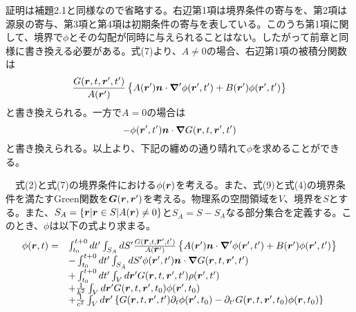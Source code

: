 \documentclass[dvipdfmx, 9pt, a4paper]{jsarticle}
\newcommand{\bm}[1]{{\mbox{\boldmath $#1$}}}
\newcommand{\bnabla}{\bm \nabla}
\begin{document}
証明は補題2.1と同様なので省略する。右辺第1項は境界条件の寄与を、第2項は源泉の寄与、第3項と第4項は初期条件の寄与を表している。このうち第1項に関して、境界で$\phi$とその勾配が同時に与えられることはない。したがって前章と同様に書き換える必要がある。式(7)より、$A \neq 0$の場合、右辺第1項の被積分関数は
\begin{equation}
\frac{G(\bm r, t, \bm r', t')}{A(\bm r')}\left\{ A(\bm r')\bm n \cdot \bnabla'\phi(\bm r', t')+B(\bm r')\phi(\bm r', t') \right\} \notag
\end{equation}
と書き換えられる。一方で$A=0$の場合は
\begin{equation}
-\phi(\bm r', t')\bm n \cdot \bnabla G(\bm r, t, \bm r', t') \notag
\end{equation}
と書き換えられる。以上より、下記の纏めの通り晴れて$\phi$を求めることができる。

\begin{tcolorbox}[title=動的な方程式のためのGreen関数]
　式(2)と式(7)の境界条件における$\phi(\bm r)$を考える。また、式(9)と式(4)の境界条件を満たすGreen関数を$\bm G(\bm r, \bm r')$を考える。物理系の空間領域を$V$、境界を$S$とする。また、$S_A=\{ \bm r|\bm r \in S | A(\bm r)\neq 0 \}$と$S_{\bar A}=S-S_A$なる部分集合を定義する。このとき、$\phi$は以下の式より求まる。
\begin{equation}
\begin{array}{ll}
\phi(\bm r, t)=&\int_{t_0}^{t+0}dt' \int_{S_A}dS' \frac{G(\bm r, t, \bm r', t')}{A(\bm r')}\left\{ A(\bm r')\bm n \cdot \bnabla'\phi(\bm r', t')+B(\bm r')\phi(\bm r', t') \right\} \\
 &-\int_{t_0}^{t+0}dt' \int_{S_{\bar A}}dS' \phi(\bm r', t')\bm n \cdot \bnabla G(\bm r, t, \bm r', t') \\
 &+\int_{t_0}^{t+0}dt'\int_V d\bm r'G(\bm r, t, \bm r', t')\rho(\bm r', t') \\
 &+\frac{1}{k^2}\int_V d\bm r'G(\bm r, t, \bm r', t_0)\phi(\bm r', t_0) \\
 &+\frac{1}{c^2}\int_V d\bm r'\left\{ G(\bm r, t, \bm r', t')\partial_t\phi(\bm r', t_0)-\partial_{t'}G(\bm r, t, \bm r', t_0)\phi(\bm r, t_0) \right\}
\end{array}
\end{equation}
\end{tcolorbox}
\end{document}
